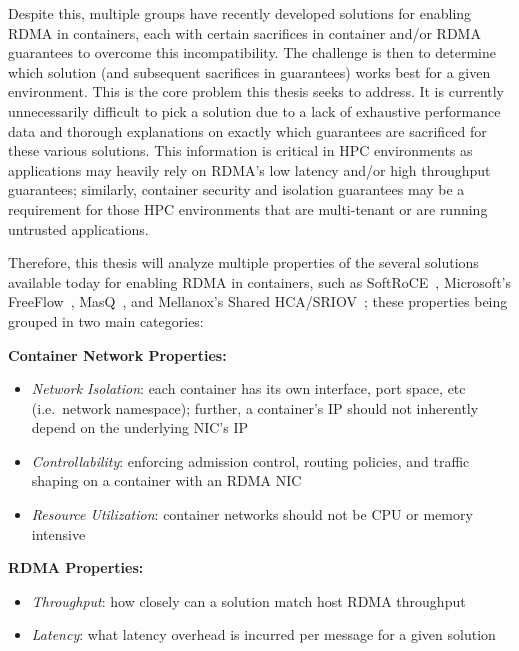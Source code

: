 \documentclass[12pt,titlepage]{article}
\begin{document}
Despite this, multiple groups have recently developed solutions for enabling RDMA in containers, each with certain sacrifices in container and/or RDMA guarantees to overcome this incompatibility.
The challenge is then to determine which solution (and subsequent sacrifices in guarantees) works best for a given environment.
This is the core problem this thesis seeks to address.
It is currently unnecessarily difficult to pick a solution due to a lack of exhaustive performance data and thorough explanations on exactly which guarantees are sacrificed for these various solutions.
This information is critical in HPC environments as applications may heavily rely on RDMA's low latency and/or high throughput guarantees; similarly, container security and isolation guarantees may be a requirement for those HPC environments that are multi-tenant or are running untrusted applications.

Therefore, this thesis will analyze multiple properties of the several solutions available today for enabling RDMA in containers, such as SoftRoCE~\cite{pandeysroce}, Microsoft's FreeFlow~\cite{kim2019freeflow}, MasQ~\cite{he2020masq}, and Mellanox's Shared HCA/SRIOV~\cite{mellanoxdockerroce};
these properties being grouped in two main categories:

\noindent
\textbf{Container Network Properties:}
\begin{itemize}[nolistsep]
   \item \textit{Network Isolation}: each container has its own interface, port space, etc (i.e.\ network namespace); further, a container's IP should not inherently depend on the underlying NIC's IP
   \item \textit{Controllability}: enforcing admission control, routing policies, and traffic shaping on a container with an RDMA NIC
   \item \textit{Resource Utilization}: container networks should not be CPU or memory intensive
\end{itemize}

\noindent
\textbf{RDMA Properties:}
\begin{itemize}[nolistsep]
   \item \textit{Throughput}: how closely can a solution match host RDMA throughput
   \item \textit{Latency}: what latency overhead is incurred per message for a given solution
\end{itemize}
\end{document}
